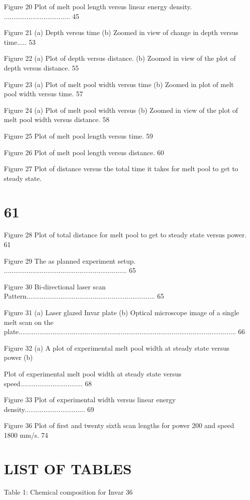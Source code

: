 \documentclass[10pt]{article}
\begin{document}
Figure 20 Plot of melt pool length versus linear energy density. ................................... 45

Figure 21 (a) Depth versus time (b) Zoomed in view of change in depth versus time..... 53

Figure 22 (a) Plot of depth versus distance. (b) Zoomed in view of the plot of depth versus distance. 55

Figure 23 (a) Plot of melt pool width versus time (b) Zoomed in plot of melt pool width versus time. 57

Figure 24 (a) Plot of melt pool width versus (b) Zoomed in view of the plot of melt pool width versus distance. 58

Figure 25 Plot of melt pool length versus time. 59

Figure 26 Plot of melt pool length versus distance. 60

Figure 27 Plot of distance versus the total time it takes for melt pool to get to steady state.

\section*{61}
Figure 28 Plot of total distance for melt pool to get to steady state versus power. 61

Figure 29 The as planned experiment setup. ................................................................. 65

Figure 30 Bi-directional laser scan Pattern.................................................................... 65

Figure 31 (a) Laser glazed Invar plate (b) Optical microscope image of a single melt scan on the plate................................................................................................................... 66

Figure 32 (a) A plot of experimental melt pool width at steady state versus power (b)

Plot of experimental melt pool width at steady state versus speed................................. 68

Figure 33 Plot of experimental width versus linear energy density................................ 69

Figure 36 Plot of first and twenty sixth scan lengths for power 200 and speed 1800 mm/s. 74

\section*{LIST OF TABLES}
Table 1: Chemical composition for Invar 36
\end{document}

